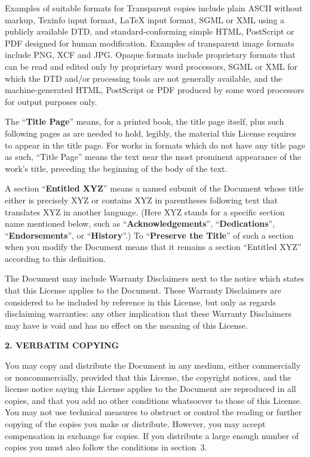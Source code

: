 Examples of suitable formats for Transparent copies include plain
ASCII without markup, Texinfo input format, LaTeX input format, SGML
or XML using a publicly available DTD, and standard-conforming
simple HTML, PostScript or PDF designed for human modification.
Examples of transparent image formats include PNG, XCF and JPG.
Opaque formats include proprietary formats that can be read and
edited only by proprietary word processors, SGML or XML for which
the DTD and/or processing tools are not generally available, and the
machine-generated HTML, PostScript or PDF produced by some word
processors for output purposes only.

The ``\textbf{Title Page}'' means, for a printed book, the title
page itself, plus such following pages as are needed to hold,
legibly, the material this License requires to appear in the title
page.  For works in formats which do not have any title page as
such, ``Title Page'' means the text near the most prominent
appearance of the work's title, preceding the beginning of the body
of the text.

A section ``\textbf{Entitled XYZ}'' means a named subunit of the
Document whose title either is precisely XYZ or contains XYZ in
parentheses following text that translates XYZ in another language.
(Here XYZ stands for a specific section name mentioned below, such
as ``\textbf{Acknowledgements}'', ``\textbf{Dedications}'',
``\textbf{Endorsements}'', or ``\textbf{History}''.) To
``\textbf{Preserve the Title}'' of such a section when you modify
the Document means that it remains a section ``Entitled XYZ''
according to this definition.

The Document may include Warranty Disclaimers next to the notice
which states that this License applies to the Document.  These
Warranty Disclaimers are considered to be included by reference in
this License, but only as regards disclaiming warranties: any other
implication that these Warranty Disclaimers may have is void and has
no effect on the meaning of this License.


\begin{center}
{\Large\bfseries  2. VERBATIM COPYING\par} 
\end{center}

You may copy and distribute the Document in any medium, either
commercially or noncommercially, provided that this License, the
copyright notices, and the license notice saying this License
applies to the Document are reproduced in all copies, and that you
add no other conditions whatsoever to those of this License.  You
may not use technical measures to obstruct or control the reading or
further copying of the copies you make or distribute.  However, you
may accept compensation in exchange for copies.  If you distribute a
large enough number of copies you must also follow the conditions in
section~3.

